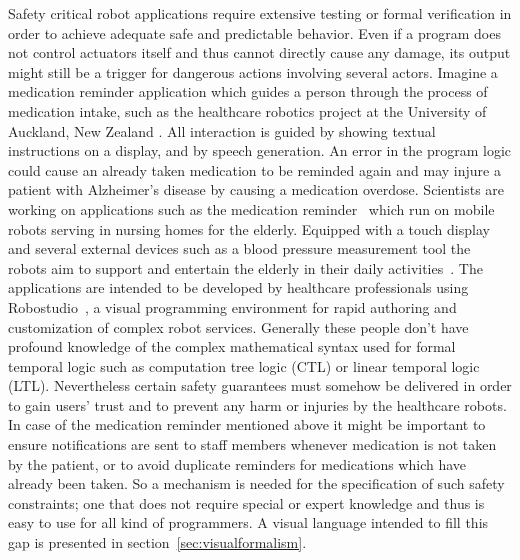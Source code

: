 \documentclass[conference]{IEEEtran}
\begin{document}
Safety critical robot applications require extensive testing or formal verification in order to achieve adequate safe and predictable behavior.
Even if a program does not control actuators itself and thus cannot directly cause any damage, its output might still be a trigger for dangerous actions involving several actors.
Imagine a medication reminder application which guides a person through the process of medication intake, such as the healthcare robotics project at the University of Auckland, New Zealand \cite{jayawardena12:_desig}. All interaction is guided by showing textual instructions on a display, and by speech generation. An error in the program logic could cause an already taken medication to be reminded again and may injure a patient with Alzheimer's disease by causing a medication overdose.
Scientists are working on applications such as the medication reminder~\cite{p11:_feasib} which run on mobile robots serving in nursing homes for the elderly. Equipped with a touch display and several external devices such as a blood pressure measurement tool the robots aim to support and entertain the elderly in their daily activities~\cite{jayawardena12:_desig,5649910}.
The applications are intended to be developed by healthcare professionals using Robostudio~\cite{robostudio}, a visual programming environment for rapid authoring and customization of complex robot services.
Generally these people don't have profound knowledge of the complex mathematical syntax used for formal temporal logic such as computation tree logic (CTL) or linear temporal logic (LTL). Nevertheless certain safety guarantees must somehow be delivered in order to gain users' trust and to prevent any harm or injuries by the healthcare robots.
In case of the medication reminder mentioned above it might be important to ensure notifications are sent to staff members whenever medication is not taken by the patient, or to avoid duplicate reminders for medications which have already been taken. So a mechanism is needed for the specification of such safety constraints; one that does not require special or expert knowledge and thus is easy to use for all kind of programmers. A visual language intended to fill this gap is presented in section~\ref{sec:visualformalism}.
\end{document}
